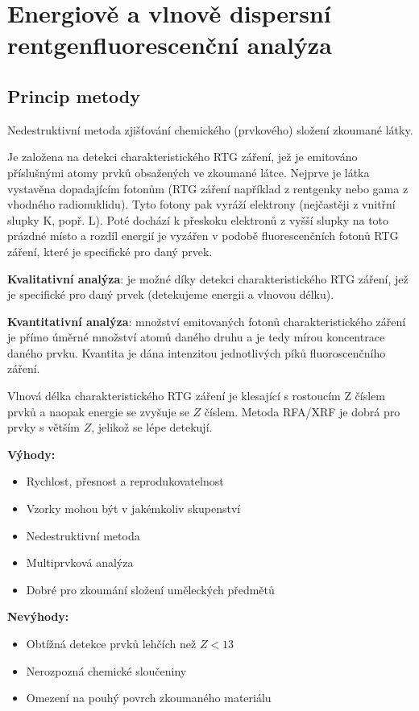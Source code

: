 \section[Rentgenofluorescenční analýza]{Energiově a vlnově dispersní rentgenfluorescenční analýza}

\subsection{Princip metody}

Nedestruktivní metoda zjišťování chemického (prvkového) složení zkoumané látky.

Je založena na detekci charakteristického RTG záření, jež je emitováno příslušnými atomy prvků obsažených ve zkoumané látce. Nejprve je látka vystavěna dopadajícím fotonům (RTG záření například z rentgenky nebo gama z vhodného radionuklidu). Tyto fotony pak vyráží elektrony (nejčastěji z vnitřní slupky K, popř. L). Poté dochází k přeskoku elektronů z vyšší slupky na toto prázdné místo a rozdíl energií je vyzářen v podobě fluorescenčních fotonů RTG záření, které je specifické pro daný prvek.

\textbf{Kvalitativní analýza}: je možné díky detekci charakteristického RTG záření, jež je specifické pro daný prvek (detekujeme energii a vlnovou délku).

\textbf{Kvantitativní analýza}: množství emitovaných fotonů charakteristického záření je přímo úměrné množství atomů daného druhu a je tedy mírou koncentrace daného prvku. Kvantita je dána intenzitou jednotlivých píků fluoroscenčního záření.

Vlnová délka charakteristického RTG záření je klesající s rostoucím Z číslem prvků a naopak energie se zvyšuje se $Z$ číslem. Metoda RFA/XRF je dobrá pro prvky s větším $Z$, jelikož se lépe detekují.

\textbf{Výhody:} \begin{itemize}
    \item Rychlost, přesnost a reprodukovatelnost
    \item Vzorky mohou být v jakémkoliv skupenství
    \item Nedestruktivní metoda
    \item Multiprvková analýza
    \item Dobré pro zkoumání složení uměleckých předmětů
\end{itemize}

\textbf{Nevýhody:} \begin{itemize}
    \item Obtížná detekce prvků lehčích než $Z<13$
    \item Nerozpozná chemické sloučeniny
    \item Omezení na pouhý povrch zkoumaného materiálu
\end{itemize}

